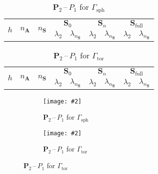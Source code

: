 \documentclass[12pt]{article}
\newcommand{\includegraphicsw}[2][1.]{\texttt{[image: \#2]}}
\newcommand{\vect}[1]{\boldsymbol{\mathbf{#1}}}
\newcommand{\sphere}{{\Gamma_{\text{sph}}}}
\newcommand{\tor}{{\Gamma_{\text{tor}}}}
\begin{document}
\clearpage

\begin{table}[h!]
	\centering
	\caption{$\vect P_2$\,--\,$P_1$ for $\sphere$} 
	\label{tab:p2p1}
	\small
	\begin{tabular}[1.3]{|c|c|c|c|c|c|c|c|c|}
		\hline
		\multirow{2}{*}{$h$} & \multirow{2}{*}{$n_{\vect A}$} & \multirow{2}{*}{$n_{\vect S}$} & \multicolumn{2}{c|}{$\vect S_0$} & \multicolumn{2}{c|}{$\vect S_n$} & \multicolumn{2}{c|}{$\vect S_{\text{full}}$} \\ 
		\cline{4-9}
		& & & $\lambda_2$ & $\lambda_{n_{\vect S}}$ & $\lambda_2$ & $\lambda_{n_{\vect S}}$ & $\lambda_2$ & $\lambda_{n_{\vect S}}$ \\ 
		\hline
		
%		
	\end{tabular}
\end{table}
\begin{table}[h!]
	\centering
	\caption{$\vect P_2$\,--\,$P_1$ for $\tor$} 
	\label{tab:p2p1_tor}
	\small
	\begin{tabular}[1.3]{|c|c|c|c|c|c|c|c|c|}
		\hline
		\multirow{2}{*}{$h$} & \multirow{2}{*}{$n_{\vect A}$} & \multirow{2}{*}{$n_{\vect S}$} & \multicolumn{2}{c|}{$\vect S_0$} & \multicolumn{2}{c|}{$\vect S_n$} & \multicolumn{2}{c|}{$\vect S_{\text{full}}$} \\ 
		\cline{4-9}
		& & & $\lambda_2$ & $\lambda_{n_{\vect S}}$ & $\lambda_2$ & $\lambda_{n_{\vect S}}$ & $\lambda_2$ & $\lambda_{n_{\vect S}}$ \\ 
		\hline
		
%		
	\end{tabular}
\end{table}
\vfill
\begin{figure}[h]
	\centering
	\begin{subfigure}{.49\linewidth}
		\centering
		\includegraphicsw{sphere_2_P2P1.png}
		\caption{$\vect P_2$\,--\,$P_1$ for $\sphere$}
	\end{subfigure}%
	\hfill
	\begin{subfigure}{.49\linewidth}
		\centering
		\includegraphicsw{torus_P2P1.png}
		\caption{$\vect P_2$\,--\,$P_1$ for $\tor$}
	\end{subfigure}	
\end{figure}
\vfill
\end{document}

